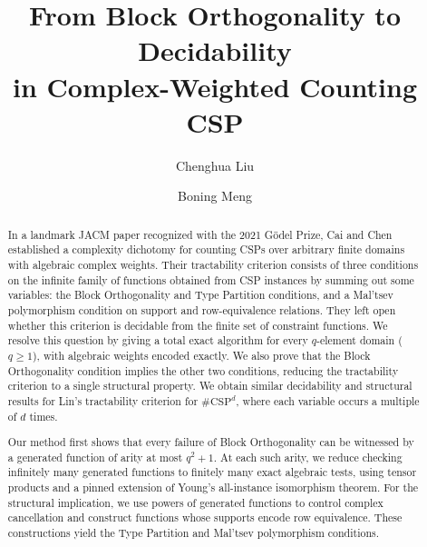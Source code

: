 \documentclass[11pt,letterpaper,onecolumn]{article}
\theoremstyle{plain}
\theoremstyle{definition}
\theoremstyle{remark}
\begin{document}
\title{From Block Orthogonality to 
Decidability \\[0.15em] in Complex-Weighted Counting CSP}

\author[1]{Chenghua Liu}
\author[2]{Boning Meng}

\date{}

\hypersetup{pageanchor=false}
\begin{titlepage}
\maketitle
\thispagestyle{empty}

\begin{abstract}
\normalsize
In a landmark JACM paper recognized with the 2021 G{\"o}del Prize, Cai and
Chen established a complexity dichotomy for counting CSPs over arbitrary
finite domains with algebraic complex weights.  Their tractability criterion
consists of three conditions on the infinite family of functions obtained
from CSP instances by summing out some variables: the Block Orthogonality
and Type Partition conditions, and a Mal'tsev polymorphism condition on support and
row-equivalence relations.  They left open whether this criterion is
decidable from the finite set of constraint functions.  We resolve this
question by giving a total exact algorithm for every $q$-element domain
($q\ge 1$), with algebraic weights encoded exactly.  We also prove that
the Block Orthogonality condition implies the other two conditions, reducing the
tractability criterion to a single structural property.  We obtain similar
decidability and structural results for Lin's tractability criterion for
$\#\mathrm{CSP}^{d}$, where each variable occurs a multiple of $d$ times.

Our method first shows that every failure of Block Orthogonality can be
witnessed by a generated function of arity at most $q^2+1$.  At each such
arity, we reduce checking infinitely many generated functions to finitely
many exact algebraic tests, using tensor products and a pinned extension of
Young's all-instance isomorphism theorem.  For the structural implication, we use powers
of generated functions to control complex cancellation and construct
functions whose supports encode row equivalence.  These constructions
yield the Type Partition and Mal'tsev polymorphism conditions.
\end{abstract}
\end{titlepage}
\end{document}
